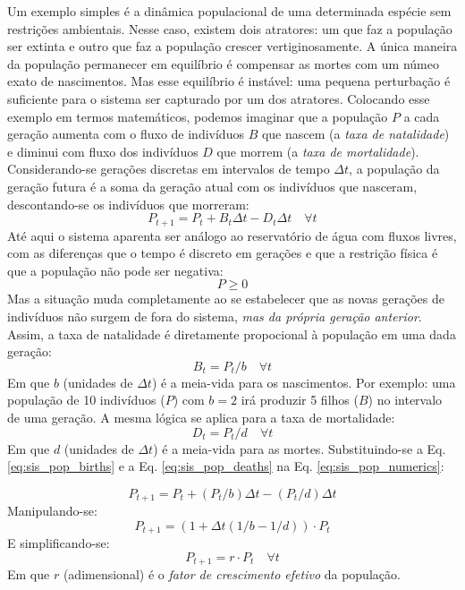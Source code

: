 \documentclass[./main.tex]{subfiles}
\begin{document}
\par Um exemplo simples é a dinâmica populacional de uma determinada espécie sem restrições ambientais. Nesse caso, existem dois atratores: um que faz a população ser extinta e outro que faz a população crescer vertiginosamente. A única maneira da população permanecer em equilíbrio é compensar as mortes com um númeo exato de nascimentos. Mas esse equilíbrio é instável: uma pequena perturbação é suficiente para o sistema ser capturado por um dos atratores. Colocando esse exemplo em termos matemáticos, podemos imaginar que a população $P$ a cada geração aumenta com o fluxo de indivíduos $B$ que nascem (a \textit{taxa de natalidade}) e diminui com fluxo dos indivíduos $D$ que morrem (a \textit{taxa de mortalidade}). Considerando-se gerações discretas em intervalos de tempo $\Delta t$, a população da geração futura é a soma da geração atual com os indivíduos que nasceram, descontando-se os indivíduos que morreram:
\begin{equation} 
	\label{eq:sis_pop_numerics}
	P_{t+1} = P_{t} + B_{t}\Delta t - D_{t}\Delta t \quad \forall t
\end{equation}
Até aqui o sistema aparenta ser análogo ao reservatório de água com fluxos livres, com as diferenças que o tempo é discreto em gerações e que a restrição física é que a população não pode ser negativa:
\[P \ge 0 \]
Mas a situação muda completamente ao se estabelecer que as novas gerações de indivíduos não surgem de fora do sistema, \textit{mas da própria geração anterior}. Assim, a taxa de natalidade é diretamente propocional à população em uma dada geração:
\begin{equation} 
	\label{eq:sis_pop_births}
	B_t = P_t/b \quad \forall t
\end{equation}
Em que $b$ (unidades de $\Delta t$) é a meia-vida para os nascimentos. Por exemplo: uma população de 10 indivíduos ($P$) com $b=2$ irá produzir 5 filhos ($B$) no intervalo de uma geração. A mesma lógica se aplica para a taxa de mortalidade:
\begin{equation} 
	\label{eq:sis_pop_deaths}
	D_t = P_t/d \quad \forall t
\end{equation}
Em que $d$ (unidades de $\Delta t$) é a meia-vida para as mortes.
Substituindo-se a Eq. \ref{eq:sis_pop_births} e a Eq. \ref{eq:sis_pop_deaths} na Eq. \ref{eq:sis_pop_numerics}:

\[P_{t+1} = P_{t} + (P_t/b)\Delta t - (P_t/d)\Delta t\]
Manipulando-se:
\[P_{t+1} = (1 + \Delta t(1/b - 1/d)) \cdot P_{t} \]
E simplificando-se:
\begin{equation} 
	\label{eq:sis_pop_equivalent}
	P_{t+1} = r\cdot P_{t} \quad \forall t
\end{equation}
Em que $r$ (adimensional) é o \textit{fator de crescimento efetivo} da população. 
\end{document}
